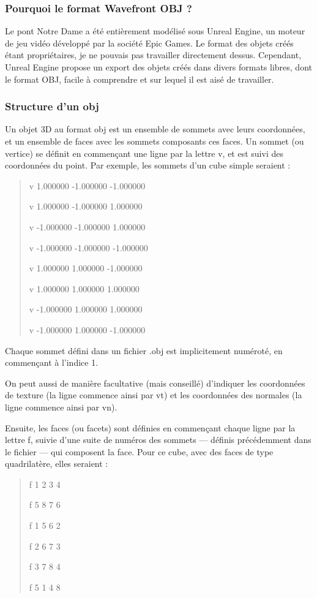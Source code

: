 \documentclass[a4paper,french]{report}
\begin{document}
				\subsubsection{Pourquoi le format Wavefront OBJ ?}
				Le pont Notre Dame a été entièrement modélisé sous Unreal Engine, un moteur de jeu vidéo développé par la société Epic Games. Le format des objets créés étant propriétaires, je ne pouvais pas travailler directement dessus. Cependant, Unreal Engine propose un export des objets créés dans divers formats libres, dont le format OBJ, facile à comprendre et sur lequel il est aisé de travailler.
				\subsubsection{Structure d'un obj}
				Un objet 3D au format obj est un ensemble de sommets avec leurs coordonnées, et un ensemble de faces avec les sommets composants ces faces. Un sommet (ou vertice) se définit en commençant une ligne par la lettre v, et est suivi des coordonnées du point. Par exemple, les sommets d'un cube simple seraient : 
				\begin{quotation}
					v 1.000000 -1.000000 -1.000000 \par 
					v 1.000000 -1.000000 1.000000 \par
					v -1.000000 -1.000000 1.000000 \par
					v -1.000000 -1.000000 -1.000000 \par
					v 1.000000 1.000000 -1.000000 \par
					v 1.000000 1.000000 1.000000 \par
					v -1.000000 1.000000 1.000000 \par
					v -1.000000 1.000000 -1.000000
				\end{quotation} \par
				Chaque sommet défini dans un fichier .obj est implicitement numéroté, en commençant à l'indice 1. \par
				On peut aussi de manière facultative (mais conseillé) d'indiquer les coordonnées de texture (la ligne commence ainsi par vt) et les coordonnées des normales (la ligne commence ainsi par vn). \par
				Ensuite, les faces (ou facets) sont définies en commençant chaque ligne par la lettre f, suivie d'une suite de numéros des sommets --- définis précédemment dans le fichier --- qui composent la face. Pour ce cube, avec des faces de type quadrilatère, elles seraient : 
				\begin{quotation}
					f 1 2 3 4 \par
					f 5 8 7 6 \par
					f 1 5 6 2 \par
					f 2 6 7 3 \par
					f 3 7 8 4 \par
					f 5 1 4 8
				\end{quotation} \par
\end{document}

